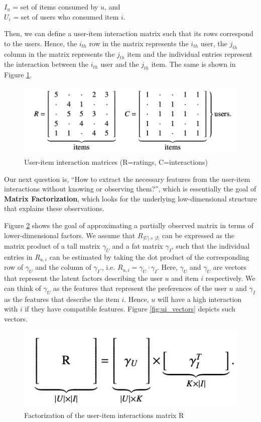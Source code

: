 \documentclass{article}
\begin{document}
$I_u$ = set of items consumed by $u$, and\\
$U_i$ = set of users who consumed item $i$.

Then, we can define a user-item interaction matrix such that its rows correspond to the users. Hence, the $i_{th}$ row in the matrix represents the $i_{th}$ user, the $j_{th}$ column in the matrix represents the $j_{th}$ item and the individual entries represent the interaction between the $i_{th}$ user and the $j_{th}$ item. The same is shown in Figure \ref{fig:rc}.

\begin{figure}
    \centering
    \includegraphics[width=0.75\linewidth]{images/R_C.png}
    \caption{User-item interaction matrices (R=ratings, C=interactions)}
    \label{fig:rc}
\end{figure}

Our next question is, “How to extract the necessary features from the user-item interactions without knowing or observing them?”, which is essentially the goal of \textbf{Matrix Factorization}, which looks for the underlying low-dimensional structure that explains these observations. 

Figure \ref{fig:mf} shows the goal of approximating a partially observed matrix in terms of lower-dimensional factors. We assume that $R_{|U|\times|I|}$ can be expressed as the matrix product of a tall matrix $\gamma_U$ and a fat matrix $\gamma_I$, such that the individual entries in $R_{u,i}$ can be estimated by taking the dot product of the corresponding row of $\gamma_U$ and the column of $\gamma_I$., i.e. $R_{u,i} = \gamma_U \cdot \gamma_I$. Here, $\gamma_U$ and $\gamma_U$ are vectors that represent the latent factors describing the user $u$ and item $i$ respectively. We can think of $\gamma_U$ as the features that represent the preferences of the user $u$ and $\gamma_I$ as the features that describe the item $i$. Hence, $u$ will have a high interaction with $i$ if they have compatible features.
Figure \ref{fig:ui_vectors} depicts such vectors.

\begin{figure}
    \centering
    \includegraphics[width=0.75\linewidth]{images/SVD.png}
    \caption{Factorization of the user-item interactions matrix R}
    \label{fig:mf}
\end{figure}
\end{document}
